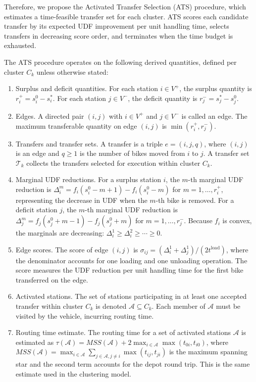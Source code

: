 \documentclass[11pt]{article}
\numberwithin{table}{section}
\numberwithin{figure}{section}
\begin{document}
Therefore, we propose the Activated Transfer Selection (ATS) procedure, which estimates a time-feasible transfer set for each cluster. ATS scores each candidate transfer by its expected UDF improvement per unit handling time, selects transfers in decreasing score order, and terminates when the time budget is exhausted.

The ATS procedure operates on the following derived quantities, defined per cluster ${{C}_{k}}$ unless otherwise stated:

\begin{enumerate}[label=(\arabic*)]
\item Surplus and deficit quantities. For each station $i\in {{V}^{+}}$, the surplus quantity is $r_{i}^{+}=s_{i}^{0}-s_{i}^{*}$. For each station $j\in {{V}^{-}}$, the deficit quantity is $r_{j}^{-}=s_{j}^{*}-s_{j}^{0}$.
\item Edges. A directed pair $(i,j)$ with $i\in {{V}^{+}}$ and $j\in {{V}^{-}}$ is called an edge. The maximum transferable quantity on edge $(i,j)$ is $\min (r_{i}^{+},r_{j}^{-})$.
\item Transfers and transfer sets. A transfer is a triple $e=(i,j,q)$, where $(i,j)$ is an edge and $q\ge 1$ is the number of bikes moved from $i$ to $j$. A transfer set ${{\mathcal{T}}_{k}}$ collects the transfers selected for execution within cluster ${{C}_{k}}$.
\item Marginal UDF reductions. For a surplus station $i$, the $m$-th marginal UDF reduction is $\Delta _{i}^{m}={{f}_{i}}(s_{i}^{0}-m+1)-{{f}_{i}}(s_{i}^{0}-m)$ for $m=1,\ldots ,r_{i}^{+}$, representing the decrease in UDF when the $m$-th bike is removed. For a deficit station $j$, the $m$-th marginal UDF reduction is $\Delta _{j}^{m}={{f}_{j}}(s_{j}^{0}+m-1)-{{f}_{j}}(s_{j}^{0}+m)$ for $m=1,\ldots ,r_{j}^{-}$. Because ${{f}_{i}}$ is convex, the marginals are decreasing: $\Delta _{i}^{1}\ge \Delta _{i}^{2}\ge \cdots \ge 0$.
\item Edge scores. The score of edge $(i,j)$ is ${{\sigma }_{ij}}=(\Delta _{i}^{1}+\Delta _{j}^{1})/(2{{t}^{\text{load}}})$, where the denominator accounts for one loading and one unloading operation. The score measures the UDF reduction per unit handling time for the first bike transferred on the edge.
\item Activated stations. The set of stations participating in at least one accepted transfer within cluster ${{C}_{k}}$ is denoted $\mathcal{A}\subseteq {{C}_{k}}$. Each member of $\mathcal{A}$ must be visited by the vehicle, incurring routing time.
\item Routing time estimate. The routing time for a set of activated stations $\mathcal{A}$ is estimated as $\tau (\mathcal{A})=MSS(\mathcal{A})+2{{\max }_{i\in \mathcal{A}}}\max ({{t}_{0i}},{{t}_{i0}})$, where $MSS(\mathcal{A})={{\max }_{i\in \mathcal{A}}}\sum\limits_{j\in \mathcal{A},j\ne i}{\max }({{t}_{ij}},{{t}_{ji}})$ is the maximum spanning star and the second term accounts for the depot round trip. This is the same estimate used in the clustering model.

\end{enumerate}
\end{document}
